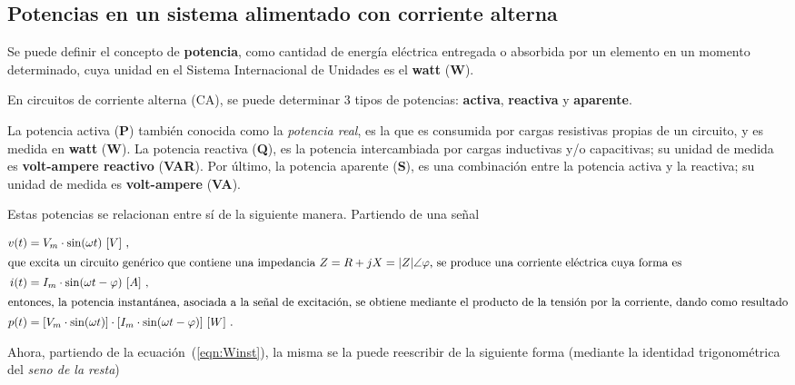 \subsection{Potencias en un sistema alimentado con corriente alterna}

   Se puede definir el concepto de \textbf{potencia}, como cantidad de energía eléctrica 
  entregada o absorbida por un elemento en un momento determinado, cuya unidad en el Sistema 
  Internacional de Unidades es el \textbf{watt} (\textbf{W}).

   En circuitos de corriente alterna (CA), se puede determinar 3 tipos de potencias:
   \textbf{activa}, \textbf{reactiva} y \textbf{aparente}.

  La potencia activa (\textbf{P}) también conocida como la \textit{potencia real}, es la que
  es consumida por cargas resistivas propias de un circuito, y es medida 
  en \textbf{watt} (\textbf{W}). La potencia reactiva (\textbf{Q}), es la potencia 
  intercambiada por cargas inductivas y/o capacitivas; su unidad de medida es 
  \textbf{volt-ampere reactivo} (\textbf{VAR}). Por último, la potencia aparente (\textbf{S}),
  es una combinación entre la potencia activa y la reactiva; su unidad de medida es 
  \textbf{volt-ampere } (\textbf{VA}).

  Estas potencias se relacionan entre sí de la siguiente manera. Partiendo de una señal

        \begin{align}
            v(t)   &= V_m \cdot \sin(\omega t)\ [V] ~, \notag \\
            \intertext{que excita un circuito genérico que contiene una impedancia 
                        $Z = R + jX = |Z| \angle \varphi$,  se produce una corriente
                        eléctrica cuya forma es}
            i(t)   &= I_m \cdot \sin(\omega t - \varphi)\ [A] \ , \notag \\
            \intertext{entonces, la potencia instantánea, asociada a la señal de 
                excitación, se obtiene mediante el producto de la tensión por la 
                corriente, dando como resultado}
            p(t)  &= [V_m \cdot \sin(\omega t)] 
            \cdot [I_m \cdot \sin(\omega t - \varphi)]\ [W]  ~.
                            \label{eqn:Winst}
         \end{align}

      
    Ahora, partiendo de la ecuación~(\ref{eqn:Winst}), la misma se la puede reescribir de la
    siguiente forma (mediante la identidad trigonométrica del \textit{seno de la resta})

